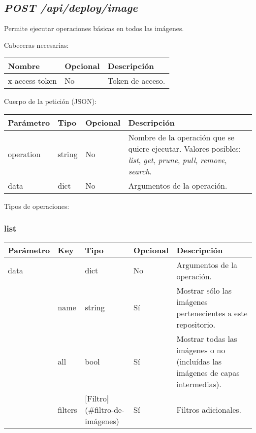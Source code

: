 	
	
	
	
	\subsection{\textit{POST /api/deploy/image}}
		Permite ejecutar operaciones básicas en todos las imágenes.
	
		Cabeceras necesarias:
		\begin{table}[h!]
			\centering
	\begin{adjustbox}{max width=\textwidth}
			\begin{tabular}{|l|l|l|}
				\hline
				Nombre & Opcional & Descripción \\ \hline
				x-access-token & No & Token de acceso. \\ \hline
			\end{tabular}
\end{adjustbox}
		\end{table}
		
		Cuerpo de la petición (JSON):
		
		\begin{table}[!h]
			\centering
	\begin{adjustbox}{max width=\textwidth}
			\begin{tabular}{|l|l|l|l|}
				\hline
				Parámetro & Tipo & Opcional & Descripción \\ \hline
				operation & string & No & Nombre de la operación que se quiere ejecutar. Valores posibles: \textit{list}, \textit{get}, \textit{prune}, \textit{pull}, \textit{remove}, \textit{search}. \\ \hline
				data & dict & No & Argumentos de la operación. \\ \hline
			\end{tabular}
\end{adjustbox}
		\end{table}
	
		Tipos de operaciones:
		
			\subsubsection{list}
				\begin{table}[!h]
					\centering
	\begin{adjustbox}{max width=\textwidth}
					\begin{tabular}{|l|l|l|l|l|}
						\hline
						Parámetro & Key & Tipo & Opcional & Descripción \\ \hline
						data &  & dict & No & Argumentos de la operación. \\ \hline
						& name & string & Sí & Mostrar sólo las imágenes pertenecientes a este repositorio. \\ \hline
						& all & bool & Sí & Mostrar todas las imágenes o no (incluídas las imágenes de capas intermedias). \\ \hline
						& filters & [Filtro](\#filtro-de-imágenes) & Sí & Filtros adicionales. \\ \hline
					\end{tabular}
\end{adjustbox}
				\end{table}
			
